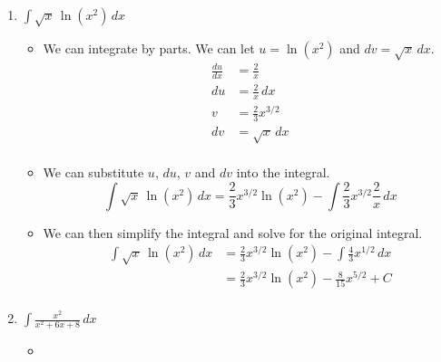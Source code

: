 \documentclass[12pt]{article}
\begin{document}
\begin{enumerate}[leftmargin=\labelsep]
\begin{enumerate}
        \item $\displaystyle{\int \sqrt{x} \, \ln(x^2) \, dx}$
        \begin{itemize}[label={}]
            \item We can integrate by parts. We can let $u = \ln(x^2)$ and $dv = \sqrt{x} \, dx$.
            \begin{equation*}
                \begin{split}
                    \displaystyle{\frac{du}{dx}} &= \displaystyle{\frac{2}{x}} \\
                    \displaystyle{du} &= \displaystyle{\frac{2}{x} \, dx} \\
                    \displaystyle{v} &= \displaystyle{\frac{2}{3} x^{3/2}} \\
                    \displaystyle{dv} &= \displaystyle{\sqrt{x} \, dx} \\
                \end{split}
            \end{equation*}
            \item We can substitute $u$, $du$, $v$ and $dv$ into the integral.
            \begin{equation*}
                \displaystyle{\int \sqrt{x} \, \ln(x^2) \, dx = \frac{2}{3} x^{3/2} \ln(x^2) - \int \frac{2}{3} x^{3/2} \frac{2}{x} \, dx}
            \end{equation*}
            \item We can then simplify the integral and solve for the original integral.
            \begin{equation*}
                \begin{split}
                    \displaystyle{\int \sqrt{x} \, \ln(x^2) \, dx} &= \displaystyle{\frac{2}{3} x^{3/2} \ln(x^2) - \int \frac{4}{3} x^{1/2} \, dx} \\
                    &= \displaystyle{\frac{2}{3} x^{3/2} \ln(x^2) - \frac{8}{15} x^{5/2} + C} \\
                \end{split}
            \end{equation*}
        \end{itemize}
    
        \newpage

        \item $\displaystyle{\int \frac{x^2}{x^2+6x+8} \, dx}$
        \begin{itemize}[label={}]
            \item
        \end{itemize}
    \end{enumerate}


\end{enumerate}
\end{document}
